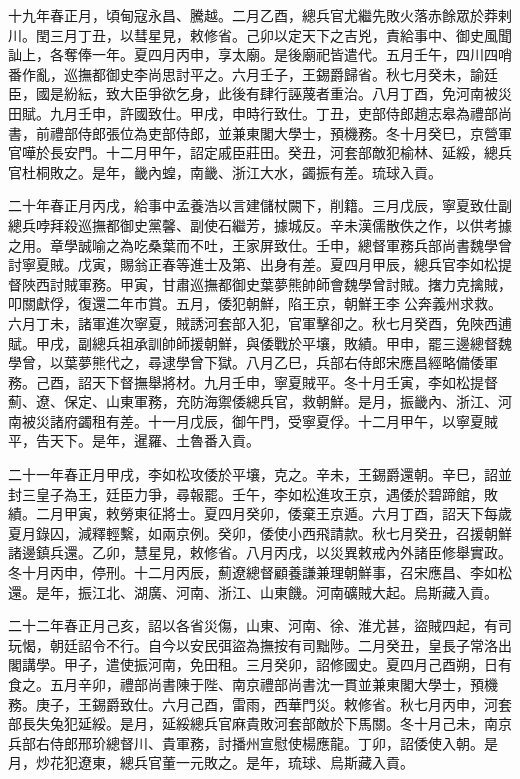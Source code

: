 \begin{pinyinscope}
十九年春正月，頃甸寇永昌、騰越。二月乙酉，總兵官尤繼先敗火落赤餘眾於莽剌川。閏三月丁丑，以彗星見，敕修省。己卯以定天下之吉兇，責給事中、御史風聞訕上，各奪俸一年。夏四月丙申，享太廟。是後廟祀皆遣代。五月壬午，四川四哨番作亂，巡撫都御史李尚思討平之。六月壬子，王錫爵歸省。秋七月癸未，諭廷臣，國是紛紜，致大臣爭欲乞身，此後有肆行誣蔑者重治。八月丁酉，免河南被災田賦。九月壬申，許國致仕。甲戌，申時行致仕。丁丑，吏部侍郎趙志皋為禮部尚書，前禮部侍郎張位為吏部侍郎，並兼東閣大學士，預機務。冬十月癸巳，京營軍官嘩於長安門。十二月甲午，詔定戚臣莊田。癸丑，河套部敵犯榆林、延綏，總兵官杜桐敗之。是年，畿內蝗，南畿、浙江大水，蠲振有差。琉球入貢。

二十年春正月丙戌，給事中孟養浩以言建儲杖闕下，削籍。三月戊辰，寧夏致仕副總兵哱拜殺巡撫都御史黨馨、副使石繼芳，據城反。辛未漢儒散佚之作，以供考據之用。章學誠喻之為吃桑葉而不吐，王家屏致仕。壬申，總督軍務兵部尚書魏學曾討寧夏賊。戊寅，賜翁正春等進士及第、出身有差。夏四月甲辰，總兵官李如松提督陜西討賊軍務。甲寅，甘肅巡撫都御史葉夢熊帥師會魏學曾討賊。撦力克擒賊，叩關獻俘，復還二年市賞。五月，倭犯朝鮮，陷王京，朝鮮王李公奔義州求救。六月丁未，諸軍進次寧夏，賊誘河套部入犯，官軍擊卻之。秋七月癸酉，免陜西逋賦。甲戌，副總兵祖承訓帥師援朝鮮，與倭戰於平壤，敗績。甲申，罷三邊總督魏學曾，以葉夢熊代之，尋逮學曾下獄。八月乙巳，兵部右侍郎宋應昌經略備倭軍務。己酉，詔天下督撫舉將材。九月壬申，寧夏賊平。冬十月壬寅，李如松提督薊、遼、保定、山東軍務，充防海禦倭總兵官，救朝鮮。是月，振畿內、浙江、河南被災諸府蠲租有差。十一月戊辰，御午門，受寧夏俘。十二月甲午，以寧夏賊平，告天下。是年，暹羅、土魯番入貢。

二十一年春正月甲戌，李如松攻倭於平壤，克之。辛未，王錫爵還朝。辛巳，詔並封三皇子為王，廷臣力爭，尋報罷。壬午，李如松進攻王京，遇倭於碧蹄館，敗績。二月甲寅，敕勞東征將士。夏四月癸卯，倭棄王京遁。六月丁酉，詔天下每歲夏月錄囚，減釋輕繫，如兩京例。癸卯，倭使小西飛請款。秋七月癸丑，召援朝鮮諸邊鎮兵還。乙卯，慧星見，敕修省。八月丙戌，以災異敕戒內外諸臣修舉實政。冬十月丙申，停刑。十二月丙辰，薊遼總督顧養謙兼理朝鮮事，召宋應昌、李如松還。是年，振江北、湖廣、河南、浙江、山東饑。河南礦賊大起。烏斯藏入貢。

二十二年春正月己亥，詔以各省災傷，山東、河南、徐、淮尤甚，盜賊四起，有司玩愒，朝廷詔令不行。自今以安民弭盜為撫按有司黜陟。二月癸丑，皇長子常洛出閣講學。甲子，遣使振河南，免田租。三月癸卯，詔修國史。夏四月己酉朔，日有食之。五月辛卯，禮部尚書陳于陛、南京禮部尚書沈一貫並兼東閣大學士，預機務。庚子，王錫爵致仕。六月己酉，雷雨，西華門災。敕修省。秋七月丙申，河套部長失兔犯延綏。是月，延綏總兵官麻貴敗河套部敵於下馬關。冬十月己未，南京兵部右侍郎邢玠總督川、貴軍務，討播州宣慰使楊應龍。丁卯，詔倭使入朝。是月，炒花犯遼東，總兵官董一元敗之。是年，琉球、烏斯藏入貢。


\end{pinyinscope}
